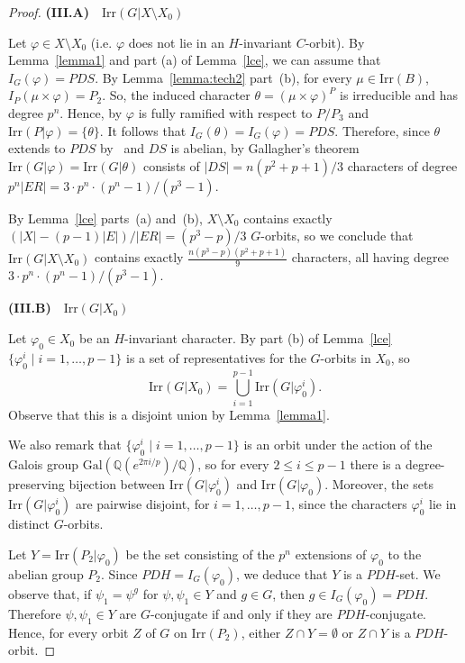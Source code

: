 \documentclass{amsart}
\def\irr#1{\mathrm{Irr}(#1)}
\begin{document}
\begin{proof}
\medskip
{\bf (III.A)}~~$\mathrm{Irr}(G|X \setminus X_0)$

\smallskip
Let $\varphi\in X \setminus X_0$ (i.e.  $\varphi$ does not lie in an $H$-invariant $C$-orbit).
By Lemma~\ref{lemma1} and  part (a) of Lemma~\ref{lce}, we can assume that $I_G(\varphi) = PDS$.
By Lemma~\ref{lemma:tech2} part~(b), for every $\mu\in\mathrm{Irr}(B)$,   $I_P(\mu\times \varphi) = P_2$.
So, the induced character $\theta= (\mu\times \varphi)^P$ is irreducible and has degree $p^{n}$.
Hence, by  \cite[Problem 6.3]{isaacs} $\varphi$ is fully ramified with respect to $P/P_3$  and
$\irr{P|\varphi} = \{ \theta \}$. It follows that $I_G(\theta) = I_G(\varphi) = PDS$.
Therefore, since $\theta$ extends to $PDS$ by~\cite[Corollary 6.28]{isaacs} and $DS$ is abelian, by Gallagher's theorem  $\irr{G|\varphi} = \irr{G|\theta}$ consists of $|DS| = n(p^2+p+1)/3$ characters of degree $p^n|ER| =3\cdot p^{n}\cdot (p^n-1)/(p^3-1)$.

By Lemma~\ref{lce} parts~(a) and~(b), $X \setminus X_0$ contains exactly  $(|X| - (p-1)|E|)/|ER| = (p^3-p)/3$ $G$-orbits, so we conclude that
$\irr{G|X\setminus X_0}$ contains exactly $\frac{n(p^3-p)(p^2+p+1)}{9}$ characters, all having degree $3\cdot p^{n}\cdot (p^n-1)/(p^3-1)$.

\medskip
{\bf (III.B)}~~$\irr{G|X_0}$

\smallskip
Let $\varphi_0\in X_0$ be an  $H$-invariant character.
By part (b) of Lemma~\ref{lce} $\{ \varphi_0^i \mid i = 1, \ldots, p-1\}$
is a set of representatives  for the $G$-orbits in $X_0$, so
\begin{equation}\label{r0}
\irr{G|X_0} = \bigcup_{i = 1}^{p-1} \irr{G|\varphi_0^i}.
\end{equation}
Observe that this is a disjoint union by Lemma~\ref{lemma1}.

We also remark that $\{ \varphi_0^i \mid i = 1, \ldots, p-1\}$ is an orbit under the action of the Galois group
$\mathrm{Gal}(\mathbb{Q}(e^{2\pi i/p})/\mathbb{Q})$, so for every $2 \leq i \leq p-1$ there is a degree-preserving bijection
between $\irr{G|\varphi_0^i}$ and $\irr{G|\varphi_0}$.
Moreover, the sets $\irr{G|\varphi_0^i}$ are pairwise disjoint, for $i = 1, \ldots, p-1$, since the characters
$\varphi_0^i$ lie in distinct $G$-orbits.

Let $Y = \irr{P_2|\varphi_0}$
be the set consisting of  the $p^n$ extensions of $\varphi_0$ to  the abelian group  $P_2$. Since $PDH=I_G(\varphi_0)$, we deduce that $Y$ is a $PDH$-set.
We observe that,  if $\psi_1 = \psi^g$ for $\psi, \psi_1 \in Y$ and $g \in G$, then
$g \in I_G(\varphi_0) = PDH$. Therefore $\psi,\psi_1\in Y$ are $G$-conjugate if and only if they are $PDH$-conjugate.
Hence, for every orbit $Z$ of $G$ on $\irr {P_2}$, either $Z\cap Y=\emptyset$ or $Z\cap Y$ is  a $PDH$-orbit. 


\end{proof}
\end{document}
